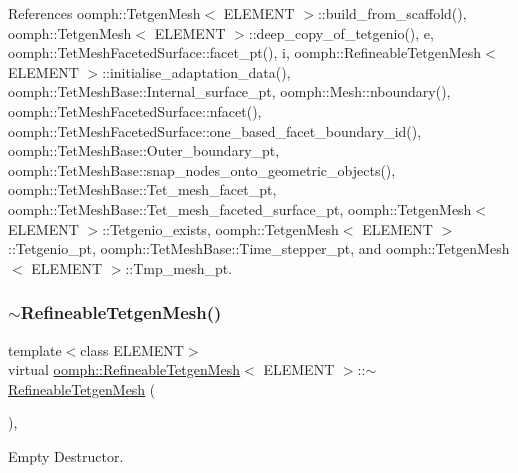 References oomph\+::\+Tetgen\+Mesh$<$ E\+L\+E\+M\+E\+N\+T $>$\+::build\+\_\+from\+\_\+scaffold(), oomph\+::\+Tetgen\+Mesh$<$ E\+L\+E\+M\+E\+N\+T $>$\+::deep\+\_\+copy\+\_\+of\+\_\+tetgenio(), e, oomph\+::\+Tet\+Mesh\+Faceted\+Surface\+::facet\+\_\+pt(), i, oomph\+::\+Refineable\+Tetgen\+Mesh$<$ E\+L\+E\+M\+E\+N\+T $>$\+::initialise\+\_\+adaptation\+\_\+data(), oomph\+::\+Tet\+Mesh\+Base\+::\+Internal\+\_\+surface\+\_\+pt, oomph\+::\+Mesh\+::nboundary(), oomph\+::\+Tet\+Mesh\+Faceted\+Surface\+::nfacet(), oomph\+::\+Tet\+Mesh\+Faceted\+Surface\+::one\+\_\+based\+\_\+facet\+\_\+boundary\+\_\+id(), oomph\+::\+Tet\+Mesh\+Base\+::\+Outer\+\_\+boundary\+\_\+pt, oomph\+::\+Tet\+Mesh\+Base\+::snap\+\_\+nodes\+\_\+onto\+\_\+geometric\+\_\+objects(), oomph\+::\+Tet\+Mesh\+Base\+::\+Tet\+\_\+mesh\+\_\+facet\+\_\+pt, oomph\+::\+Tet\+Mesh\+Base\+::\+Tet\+\_\+mesh\+\_\+faceted\+\_\+surface\+\_\+pt, oomph\+::\+Tetgen\+Mesh$<$ E\+L\+E\+M\+E\+N\+T $>$\+::\+Tetgenio\+\_\+exists, oomph\+::\+Tetgen\+Mesh$<$ E\+L\+E\+M\+E\+N\+T $>$\+::\+Tetgenio\+\_\+pt, oomph\+::\+Tet\+Mesh\+Base\+::\+Time\+\_\+stepper\+\_\+pt, and oomph\+::\+Tetgen\+Mesh$<$ E\+L\+E\+M\+E\+N\+T $>$\+::\+Tmp\+\_\+mesh\+\_\+pt.

\mbox{\label{classoomph_1_1RefineableTetgenMesh_ac2ac6c6961647d0f332a6742f52dd27d}} 
\subsubsection{\texorpdfstring{$\sim$\+Refineable\+Tetgen\+Mesh()}{~RefineableTetgenMesh()}}
{\footnotesize\ttfamily template$<$class E\+L\+E\+M\+E\+NT$>$ \\
virtual \hyperlink{classoomph_1_1RefineableTetgenMesh}{oomph\+::\+Refineable\+Tetgen\+Mesh}$<$ E\+L\+E\+M\+E\+NT $>$\+::$\sim$\hyperlink{classoomph_1_1RefineableTetgenMesh}{Refineable\+Tetgen\+Mesh} (\begin{DoxyParamCaption}{ }\end{DoxyParamCaption})\hspace{0.3cm}{\ttfamily [inline]}, {\ttfamily [virtual]}}



Empty Destructor. 




